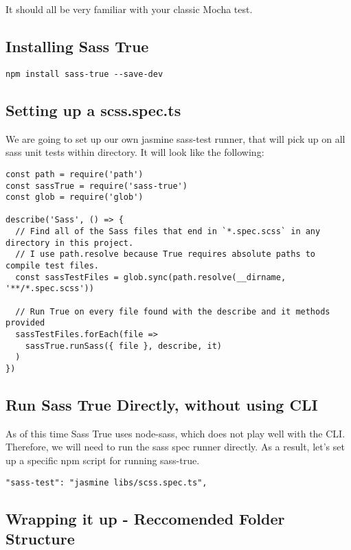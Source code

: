 It should all be very familiar with your classic Mocha test.

\subsection{ Installing Sass True }
\begin{verbatim}
npm install sass-true --save-dev
\end{verbatim}

\subsection{ Setting up a scss.spec.ts }
We are going to set up our own jasmine sass-test runner, that will pick up on
all sass unit tests within directory. It will look like the following:
\begin{lstlisting}
const path = require('path')
const sassTrue = require('sass-true')
const glob = require('glob')

describe('Sass', () => {
  // Find all of the Sass files that end in `*.spec.scss` in any directory in this project.
  // I use path.resolve because True requires absolute paths to compile test files.
  const sassTestFiles = glob.sync(path.resolve(__dirname, '**/*.spec.scss'))

  // Run True on every file found with the describe and it methods provided
  sassTestFiles.forEach(file =>
    sassTrue.runSass({ file }, describe, it)
  )
})
\end{lstlisting}

\subsection{ Run Sass True Directly, without using CLI }
As of this time Sass True uses node-sass, which does not play well with the CLI.
Therefore, we will need to run the sass spec runner directly. As a result,
let's set up a specific npm script for running sass-true.
\begin{verbatim}
"sass-test": "jasmine libs/scss.spec.ts",
\end{verbatim}

\subsection{ Wrapping it up - Reccomended Folder Structure }


